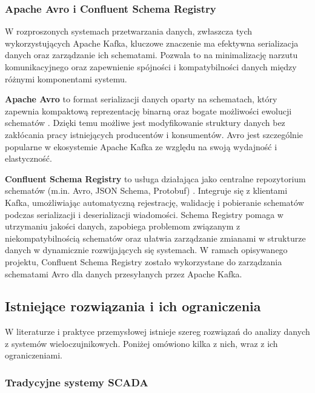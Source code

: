 \subsubsection{Apache Avro i Confluent Schema Registry}
\label{subsubsec:avro_schema_registry}

W rozproszonych systemach przetwarzania danych, zwłaszcza tych wykorzystujących Apache Kafka, kluczowe znaczenie ma efektywna serializacja danych oraz zarządzanie ich schematami. Pozwala to na minimalizację narzutu komunikacyjnego oraz zapewnienie spójności i kompatybilności danych między różnymi komponentami systemu.

\textbf{Apache Avro} to format serializacji danych oparty na schematach, który zapewnia kompaktową reprezentację binarną oraz bogate możliwości ewolucji schematów \citep{avro_documentation}. Dzięki temu możliwe jest modyfikowanie struktury danych bez zakłócania pracy istniejących producentów i konsumentów. Avro jest szczególnie popularne w ekosystemie Apache Kafka ze względu na swoją wydajność i elastyczność.

\textbf{Confluent Schema Registry} to usługa działająca jako centralne repozytorium schematów (m.in. Avro, JSON Schema, Protobuf) \citep{confluent_schema_registry}. Integruje się z klientami Kafka, umożliwiając automatyczną rejestrację, walidację i pobieranie schematów podczas serializacji i deserializacji wiadomości. Schema Registry pomaga w utrzymaniu jakości danych, zapobiega problemom związanym z niekompatybilnością schematów oraz ułatwia zarządzanie zmianami w strukturze danych w dynamicznie rozwijających się systemach. W ramach opisywanego projektu, Confluent Schema Registry zostało wykorzystane do zarządzania schematami Avro dla danych przesyłanych przez Apache Kafka.

\subsection{Istniejące rozwiązania i ich ograniczenia}
\label{subsec:istniejace_rozwiazania}

W literaturze i praktyce przemysłowej istnieje szereg rozwiązań do analizy danych z systemów wieloczujnikowych. Poniżej omówiono kilka z nich, wraz z ich ograniczeniami.

\subsubsection{Tradycyjne systemy SCADA}
\label{subsubsec:scada}

